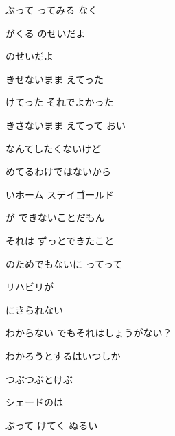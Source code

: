 \documentclass[a4paper,tate,twocolumn,12pt]{ltjtarticle}
\begin{document}
\begin{flushleft}
\begin{minipage}{\linewidth}
ぶって ってみる なく

がくる のせいだよ

のせいだよ
\end{minipage}

\vspace{2em}

\noindent\begin{minipage}{\linewidth}
きせないまま えてった

けてった それでよかった

きさないまま えてって おい
\end{minipage}

\vspace{2em}

\noindent\begin{minipage}{\linewidth}
なんてしたくないけど

めてるわけではないから

いホーム ステイゴールド

が できないことだもん

それは ずっとできたこと

のためでもないに ってって

リハビリが

にきられない
\end{minipage}

\vspace{2em}

\noindent\begin{minipage}{\linewidth}
わからない でもそれはしょうがない？

わかろうとするはいつしか

つぶつぶとけぶ

シェードのは
\end{minipage}

\vspace{2em}

\noindent\begin{minipage}{\linewidth}
ぶって けてく ぬるい


\end{minipage}
\end{flushleft}
\end{document}
